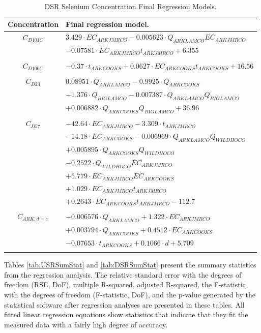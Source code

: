 \begin{linenumbers}
\begin{table}[htbp]
	\centering
	\caption{DSR Selenium Concentration Final Regression Models.}
	\label{tab:DSRFinalRegression}
	\begin{tabular}{c l}
		\toprule
		Concentration	& Final regression model.\\
		\toprule
		$ C_{D101C} $	& $3.429 \cdot EC_{ARKJMRCO} - 0.005623 \cdot Q_{ARKLAMCO}EC_{ARKJMRCO}$\\
		& $-0.07581 \cdot EC_{ARKJMRCO}t_{ARKJMRCO} + 6.355$\\
		\\
		$ C_{D106C} $	& $-0.37 \cdot t_{ARKCOOKS}+ 0.0627 \cdot EC_{ARKCOOKS}t_{ARKCOOKS} + 16.56$\\
		\\
		$ C_{D23} $		& $0.08951 \cdot Q_{ARKLAMCO} -0.9925 \cdot Q_{ARKCOOKS}$\\
		& $-1.376 \cdot Q_{BIGLAMCO} -0.007387 \cdot Q_{ARKLAMCO}Q_{BIGLAMCO}$\\
		& $+0.006882 \cdot Q_{ARKCOOKS}Q_{BIGLAMCO} + 36.96$\\ 
		\\
		$ C_{D57} $		& $-42.64 \cdot EC_{ARKJMRCO} -3.309 \cdot t_{ARKJMRCO}$\\
		& $-14.18 \cdot EC_{ARKCOOKS} -0.006969 \cdot Q_{ARKLAMCO}Q_{WILDHOCO}$\\
		& $+0.005895 \cdot Q_{ARKCOOKS}Q_{WILDHOCO}$\\
		& $-0.2522 \cdot Q_{WILDHOCO}EC_{ARKJMRCO}$\\
		& $+5.779 \cdot EC_{ARKJMRCO}EC_{ARKCOOKS}$\\
		& $+1.029 \cdot EC_{ARKJMRCO}t_{ARKJMRCO}$\\
		& $+0.2643 \cdot EC_{ARKCOOKS}t_{ARKJMRCO} -112.7$\\
		\\
		$ C_{ARK,d=x} $		& $-0.006576 \cdot Q_{ARKLAMCO} +1.322 \cdot EC_{ARKJMRCO}$\\
		& $+0.003794 \cdot Q_{ARKCOOKS} +0.4512 \cdot EC_{ARKCOOKS}$\\
		& $-0.07653 \cdot t_{ARKCOOKS} +0.1066 \cdot d + 5.709$\\
		\bottomrule \\
	\end{tabular}
\end{table}

Tables \ref{tab:USRSumStat} and \ref{tab:DSRSumStat} present the summary statistics from the regression analysis.  The relative standard error with the degrees of freedom (RSE, DoF), multiple R-squared, adjusted R-squared, the F-statistic with the degrees of freedom (F-statistic, DoF), and the p-value generated by the statistical software after regression analyses are presented in these tables.  All fitted linear regression equations show statistics that indicate that they fit the measured data with a fairly high degree of accuracy.


\end{linenumbers}
